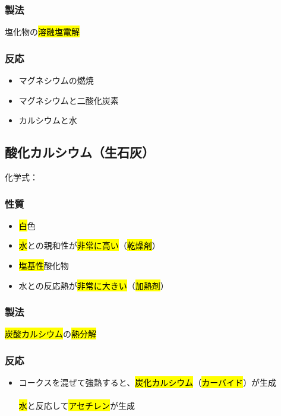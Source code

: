 \subsubsection{製法}
塩化物の\hl{溶融塩電解} \K
\subsubsection{反応}
\begin{itemize}
  \item マグネシウムの燃焼\\
  \item マグネシウムと二酸化炭素\\
  \item カルシウムと水\\
\end{itemize}

\subsection{酸化カルシウム（生石灰）}
化学式：\hl{}
\subsubsection{性質}
\begin{itemize}
  \item \hl{白}色
  \item \hl{水}との親和性が\hl{非常に高い}（\hl{乾燥剤}）
  \item \hl{塩基性}酸化物
  \item 水との反応熱が\hl{非常に大きい}（\hl{加熱剤}）
\end{itemize}
\subsubsection{製法}
\hl{炭酸カルシウム}の\hl{熱分解}\\
\subsubsection{反応}
\begin{itemize}
  \item コークスを混ぜて強熱すると、\hl{炭化カルシウム}（\hl{カーバイド}）が生成\\
        \\
        \hl{水}と反応して\hl{アセチレン}が生成\\
\end{itemize}
